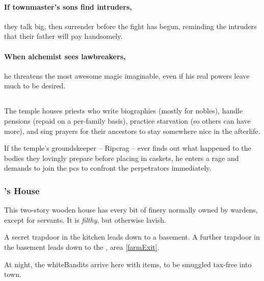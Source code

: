 \begin{multicols}{2}

\paragraph{If \gls{townmaster}'s sons find intruders,}
they talk big, then surrender before the fight has begun, reminding the intruders that their father will pay handsomely.

\citadelAlchemist

\showStdSpells

\label{citadel_alchemist}

\paragraph{When \gls{alchemist} sees lawbreakers,}
he threatens the most awesome magic imaginable, even if his real powers leave much to be desired.

\townmaster

\subsection{}

The temple houses priests who write biographies (mostly for nobles), handle pensions (repaid on a per-family basis), practice starvation (so others can have more), and sing prayers for their ancestors to stay somewhere nice in the afterlife.

If the temple's groundskeeper -- Ripcrag -- ever finds out what happened to the bodies they lovingly prepare before placing in caskets, he enters a rage and demands to join the \glspl{pc} to confront the perpetrators immediately.


\subsubsection{'s House}

This two-story wooden house has every bit of finery normally owned by \glspl{warden}, except for servants.
It is \emph{filthy}, but otherwise lavish.

A secret trapdoor in the kitchen leads down to a basement.
A further trapdoor in the basement leads down to the , area \vref{farmExit}.

At night, the \gls{whiteBandits} arrive here with items, to be smuggled tax-free into \gls{town}.

\end{multicols}
